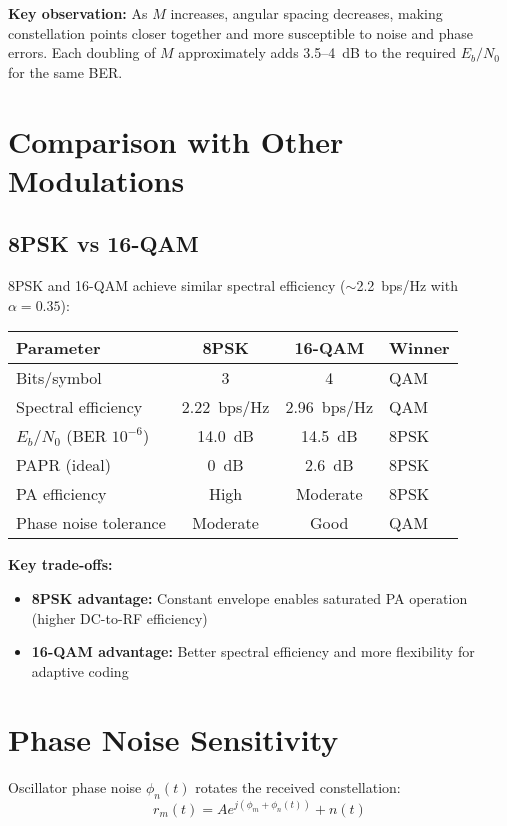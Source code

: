 \textbf{Key observation:} As $M$ increases, angular spacing decreases, making constellation points closer together and more susceptible to noise and phase errors. Each doubling of $M$ approximately adds 3.5--4~dB to the required $E_b/N_0$ for the same BER.

\section{Comparison with Other Modulations}

\subsection{8PSK vs 16-QAM}

8PSK and 16-QAM achieve similar spectral efficiency ($\sim$2.2~bps/Hz with $\alpha = 0.35$):

\begin{center}
\begin{tabular}{@{}lccl@{}}
\toprule
Parameter & 8PSK & 16-QAM & Winner \\
\midrule
Bits/symbol & 3 & 4 & QAM \\
Spectral efficiency & 2.22~bps/Hz & 2.96~bps/Hz & QAM \\
$E_b/N_0$ (BER $10^{-6}$) & 14.0~dB & 14.5~dB & 8PSK \\
PAPR (ideal) & 0~dB & 2.6~dB & 8PSK \\
PA efficiency & High & Moderate & 8PSK \\
Phase noise tolerance & Moderate & Good & QAM \\
\bottomrule
\end{tabular}
\end{center}

\textbf{Key trade-offs:}
\begin{itemize}
\item \textbf{8PSK advantage:} Constant envelope enables saturated PA operation (higher DC-to-RF efficiency)
\item \textbf{16-QAM advantage:} Better spectral efficiency and more flexibility for adaptive coding
\end{itemize}

\section{Phase Noise Sensitivity}

Oscillator phase noise $\phi_n(t)$ rotates the received constellation:
\begin{equation}
r_m(t) = Ae^{j(\phi_m + \phi_n(t))} + n(t)
\end{equation}

